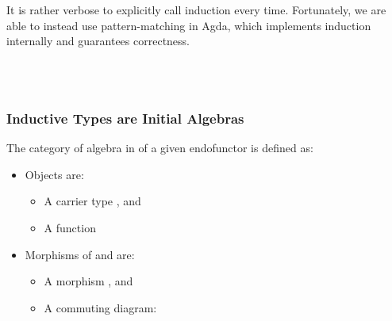 It is rather verbose to explicitly call induction every time. Fortunately, we are able to instead use pattern-matching in Agda, which implements induction internally and guarantees correctness.

\begin{code}%
\>[0]\AgdaSpace{}%
\AgdaSymbol{:}\AgdaSpace{}%
\AgdaSpace{}%
\AgdaSpace{}%
\<%
\\
\>[0]\AgdaSpace{}%
\AgdaSpace{}%
\AgdaSymbol{=}\AgdaSpace{}%
\<%
\\
\>[0]\AgdaSpace{}%
\AgdaSymbol{(}\AgdaSpace{}%
\AgdaSymbol{)}\AgdaSpace{}%
\AgdaSymbol{=}\AgdaSpace{}%
\AgdaSpace{}%
\AgdaSymbol{(}\AgdaSpace{}%
\AgdaSymbol{)}\<%
\end{code}

\subsubsection*{Inductive Types are Initial Algebras}

The category of algebra in  of a given endofunctor  \AgdaSymbol{:}    is defined as:
\begin{itemize}
  \item{Objects are:}
  \begin{itemize}
    \item{A carrier type  \AgdaSymbol{:} }, and
    \item{A function  \AgdaSymbol{:}    }
  \end{itemize}
  \item{Morphisms of \AgdaSymbol{(} \AgdaInductiveConstructor{,} \AgdaSymbol{)} and \AgdaSymbol{(} \AgdaInductiveConstructor{,} \AgdaSymbol{)} are:}
  \begin{itemize}
    \item{A morphism  \AgdaSymbol{:}   }, and
    \item{A commuting diagram:}
  \end{itemize}
\end{itemize}

